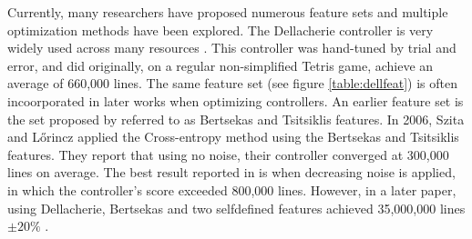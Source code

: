 Currently, many researchers have proposed numerous 
feature sets and multiple 
optimization methods have been explored. 
The Dellacherie controller is very widely used across many resources
\citep{fahey}. This controller was hand-tuned by trial and error,
and did originally, on a regular non-simplified Tetris game, achieve an average of
660,000 lines. The same feature set (see figure \ref{table:dellfeat}) is 
often incoorporated in later works when optimizing controllers. An earlier
feature set is the set proposed by \citep{Bertsekas} referred to as Bertsekas and
Tsitsiklis features. In 2006, Szita and L\H{o}rincz \citep{szita:06} applied the Cross-entropy
method using the Bertsekas and Tsitsiklis features. They report that using no noise,
their controller converged at 300,000 lines on average. 
The best result reported in \citep{szita:06}
is when decreasing noise is applied, 
in which the controller's score exceeded 800,000 lines. 
However, in a later paper, using Dellacherie, 
Bertsekas and two selfdefined features achieved 
35,000,000 lines $\pm 20\%$  \citep{scherrer2009}.\\


